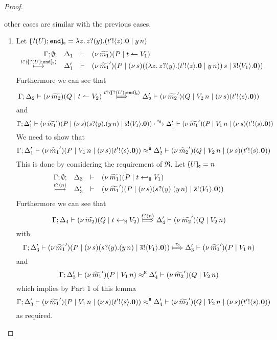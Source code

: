 \begin{proof}
\begin{enumerate}
				other cases are similar with the previous cases.
				\begin{enumerate}
					\item	Let $[\!\!(? (U) ; \mathtt{end})\!\!]_{\mathsf{c}} = \lambda z.\, z ? (y) . (t' ! \langle z \rangle . \mathbf{0} \;|\; y\, {n})$
							\[
								\begin{array}{rcll} \Gamma; \emptyset; &\Delta_1& \vdash& (\nu\, \widetilde{m_1})(P \;|\; t \leftharpoonup V_1  ) \\ \stackrel{t ? \langle [\!\!(? (U) ; \mathtt{end})\!\!]_{\mathsf{c}} \rangle}{\longmapsto} &\Delta_1'& \vdash &  (\nu\, \widetilde{m_1}')(P \;|\; (\nu\, s)( (\lambda z.\, z ? (y) . (t' ! \langle z \rangle . \mathbf{0} \;|\; y\, {n}))\, {s} \;|\; \overline{s} ! \langle V_1 \rangle . \mathbf{0})) \end{array}
							\]
							Furthermore we can see that
							\[
								\horel{\Gamma}{\Delta_2}{\newsp{\widetilde{m_2}}{Q \Par \ntrigger{t}{V_2}  } }
								{\Hby{\bactinp{t}{\omapchar{\btinp{U} \tinact}}}}
								{\Delta_2'}{\newsp{\widetilde{m_2}'}{Q \Par \appl{V_2}{n} \Par \newsp{s}{\bout{t'}{s} \inact}}}
							\]
							and
							\[
								\Gamma; \Delta_1' \vdash (\nu\, \widetilde{m_1}')(P \;|\; (\nu\, s)(s ? (y) . (y\, {n}) \;|\; \overline{s} ! \langle V_1 \rangle . \mathbf{0})) \stackrel{\tau_{\mathsf{d}}}{\longmapsto} \Delta_1' \vdash (\nu\, \widetilde{m_1}')(P \;|\; V_1\, {n}\;|\; (\nu\, s)(t' ! \langle s \rangle . \mathbf{0}))
							\]
							We need to show that
							\[
								\Gamma; \Delta_1' \vdash (\nu\, \widetilde{m_1}')(P \;|\; V_1\, {n} \;|\; (\nu\, s)(t' ! \langle s \rangle . \mathbf{0})) \approx^\mathtt{H} \Delta_2' \vdash (\nu\, \widetilde{m_2}')(Q \;|\; V_2\, {n} \;|\; (\nu\, s)(t' ! \langle s \rangle . \mathbf{0}))
							\]
							This is done by considering the requirement of $\Re$.
							Let $[\!\!(U)\!\!]_{\mathsf{c}} = n$
							\[
					\begin{array}{rcll} \Gamma; \emptyset; &\Delta_3& \vdash& (\nu\, \widetilde{m_1})(P \;|\; t \hookleftarrow_{\mathtt{H}} V_1  ) \\ \stackrel{t ? \langle n \rangle}{\longmapsto} &\Delta_3'& \vdash &  (\nu\, \widetilde{m_1}')(P \;|\; (\nu\, s)(s ? (y) . (y\, {n}) \;|\; \overline{s} ! \langle V_1 \rangle . \mathbf{0})) \end{array}
							\]
							Furthermore we can see that
							\[
								\horel{\Gamma}{\Delta_4}{\newsp{\widetilde{m_2}}{Q \Par \htrigger{t}{V_2}  } }
							{\Hby{\bactinp{t}{n}}}
			{\Delta_4'}{\newsp{\widetilde{m_2}'}{Q \Par \appl{V_2}{n}}}
							\]
							with
							\[
					\horel{\Gamma}{\Delta_3'}{\newsp{\widetilde{m_1}'}{P \Par \newsp{s}{\binp{s}{y}{(\appl{y}{n})} \Par \bout{\dual{s}}{V_1} \inact}}}
								{\Hby{\dtau}}
								{\Delta_3'}{\newsp{\widetilde{m_1}'}{P \Par \appl{V_1}{n}}}
							\]
							and
							\[
								\Gamma; \Delta_3' \vdash (\nu\, \widetilde{m_1}')(P \;|\; V_1\, {n}) \approx^\mathtt{H} \Delta_4' \vdash (\nu\, \widetilde{m_2}')(Q \;|\; V_2\, {n})
							\]
							which implies by Part 1 of this lemma
							\[
								\Gamma; \Delta_3' \vdash (\nu\, \widetilde{m_1}')(P \;|\; V_1\, {n} \;|\; (\nu\, s)(t' ! \langle s \rangle . \mathbf{0})) \approx^\mathtt{H} \Delta_4' \vdash (\nu\, \widetilde{m_2}')(Q \;|\; V_2\, {n} \;|\; (\nu\, s)(t' ! \langle s \rangle . \mathbf{0}))
							\]
							as required.


\end{enumerate}
\end{enumerate}
\end{proof}
